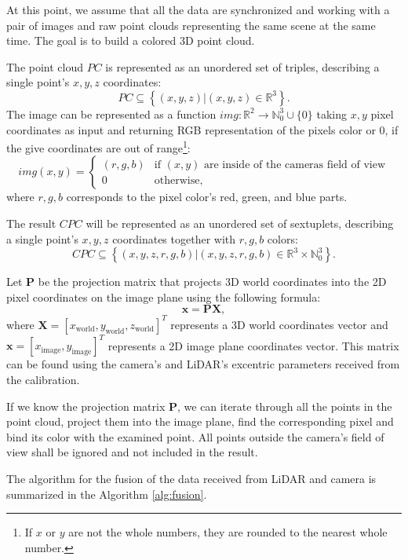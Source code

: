 At this point, we assume that all the data are synchronized and working with a pair of images and raw point clouds representing the same scene at the same time. The goal is to build a colored 3D point cloud.\par
The point cloud $PC$ is represented as an unordered set of triples, describing a single point's $x, y, z$ coordinates:
$$
    PC \subseteq \left\{ (x,y,z) | (x,y,z) \in \mathbb{R}^3\right\}.
$$
The image can be represented as a function $img: \mathbb{R}^2 \rightarrow \mathbb{N}_0^3 \cup \{0\}$ taking $x,y$ pixel coordinates as input and returning RGB representation of the pixels color or 0, if the give coordinates are out of range\footnote{If $x$ or $y$ are not the whole numbers, they are rounded to the nearest whole number.}:
$$
    img(x,y) = \begin{cases}
        (r,g,b) & \text{if $(x,y)$ are inside of the cameras field of view} \\
        0       & \text{otherwise,}
    \end{cases}
$$
where $r,g,b$ corresponds to the pixel color's red, green, and blue parts.\par
The result $CPC$ will be represented as an unordered set of sextuplets, describing a single point's $x, y, z$ coordinates together with $r, g, b$ colors:
$$
    CPC \subseteq \left\{ (x,y,z,r,g,b) | (x,y,z,r,g,b) \in \mathbb{R}^3 \times \mathbb{N}_0^3 \right\}.
$$\par
Let $\mathbf{P}$ be the projection matrix that projects 3D world coordinates into the 2D pixel coordinates on the image plane using the following formula:
$$
    \mathbf{x} = \mathbf{P}\mathbf{X},
$$
where $\mathbf{X} = \left[x_\text{world},y_\text{world},z_\text{world}\right]^T$ represents a 3D world coordinates vector and $\mathbf{x} = \left[x_\text{image}, y_\text{image}\right]^T$ represents a 2D image plane coordinates vector. This matrix can be found using the camera's and LiDAR's excentric parameters received from the calibration. \cite{pinholeCitation}\par
If we know the projection matrix $\mathbf{P}$, we can iterate through all the points in the point cloud, project them into the image plane, find the corresponding pixel and bind its color with the examined point. All points outside the camera's field of view shall be ignored and not included in the result.\par
The algorithm for the fusion of the data received from LiDAR and camera is summarized in the Algorithm \ref{alg:fusion}.

